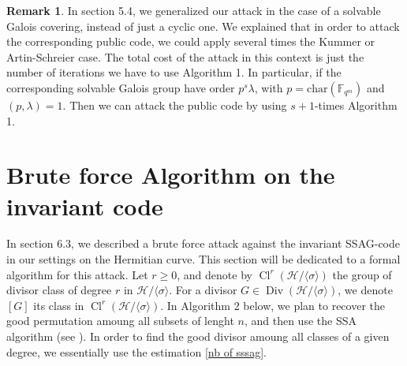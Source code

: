 \documentclass[10pt]{article}
\theoremstyle{definition}
\theoremstyle{definition}
\newtheorem{rq1}[thm]{Remark}
\theoremstyle{definition}
\newcommand{\s}{\vspace{0.3cm}}
\newcommand{\fqm}{\mathbb{F}_{q^m}}
\newcommand{\Div}{\operatorname{Div}}
\newcommand{\Cl}{\operatorname{Cl}}
\begin{document}
\s


\begin{rq1}
In section 5.4, we generalized our attack in the case of a solvable Galois covering, instead of just a cyclic one. We explained that in order to attack the corresponding public code, we could apply several times the Kummer or Artin-Schreier case. The total cost of the attack in this context is just the number of iterations we have to use Algorithm 1. In particular, if the corresponding solvable Galois group have order $p^s\lambda$, with $p=\mathrm{char}(\fqm)$ and $(p,\lambda)=1$. Then we can attack the public code by using $s+1$-times Algorithm 1.
\end{rq1}

\s

\section{Brute force Algorithm on the invariant code}

\s

In section 6.3, we described a brute force attack against the invariant SSAG-code in our settings on the Hermitian curve. This section will be dedicated to a formal algorithm for this attack. 
Let $r \geq 0$, and denote by $\Cl^r(\mathcal{H}/\langle \sigma \rangle)$ the group of divisor class of degree $r$ in $\mathcal{H}/\langle \sigma \rangle$. For a divisor $G \in \Div(\mathcal{H}/\langle \sigma \rangle)$, we denote $[G]$ its class in $\Cl^r(\mathcal{H}/\langle \sigma \rangle)$. In Algorithm 2 below, we plan to recover the good permutation amoung all subsets of lenght $n$, and then use the SSA algorithm (see \cite{SSA}). In order to find the good divisor amoung all classes of a given degree, we essentially use the estimation \eqref{nb of sssag}.
\end{document}
